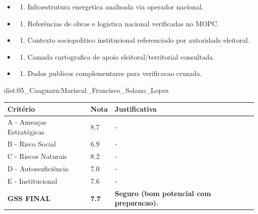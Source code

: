 {\begin{itemize}
\item
  \begin{enumerate}
  \def\labelenumi{\arabic{enumi})}
  \setcounter{enumi}{7}
  \tightlist
  \item
    Infraestrutura energetica analisada via operador nacional.
  \end{enumerate}
\item
  \begin{enumerate}
  \def\labelenumi{\arabic{enumi})}
  \setcounter{enumi}{8}
  \tightlist
  \item
    Referências de obras e logistica nacional verificadas no MOPC.
  \end{enumerate}
\item
  \begin{enumerate}
  \def\labelenumi{\arabic{enumi})}
  \setcounter{enumi}{9}
  \tightlist
  \item
    Contexto sociopolitico institucional referenciado por autoridade
    eleitoral.
  \end{enumerate}
\item
  \begin{enumerate}
  \def\labelenumi{\arabic{enumi})}
  \setcounter{enumi}{10}
  \tightlist
  \item
    Camada cartografica de apoio eleitoral/\allowbreak territorial consultada.
  \end{enumerate}
\item
  \begin{enumerate}
  \def\labelenumi{\arabic{enumi})}
  \setcounter{enumi}{11}
  \tightlist
  \item
    Dados publicos complementares para verificacao cruzada.
  \end{enumerate}
\end{itemize}}{dist:05_Caaguazu:Mariscal_Francisco_Solano_Lopez}
\begin{table}[ht!]
\small \begin{tabular}{p{3.0cm}p{0.8cm}p{6.0cm}} \toprule
\textbf{Critério} & \textbf{Nota} & \textbf{Justificativa} \\ \midrule
A - Ameaças Estratégicas & 8.7 & - \\
B - Risco Social & 6.9 & - \\
C - Riscos Naturais & 8.2 & - \\
D - Autossuficiência & 7.0 & - \\
E - Institucional & 7.6 & - \\
\midrule \textbf{GSS FINAL} & \textbf{7.7} & \textbf{Seguro (bom potencial com preparacao).} \\ \bottomrule \end{tabular}
\end{table}
